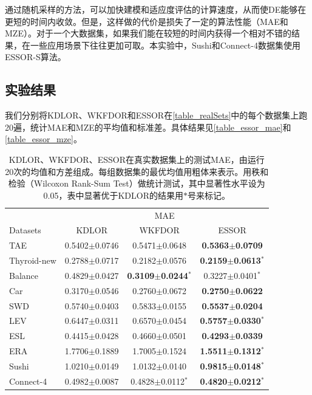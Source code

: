 通过随机采样的方法，可以加快建模和适应度评估的计算速度，从而使DE能够在更短的时间内收敛。但是，这样做的代价是损失了一定的算法性能（MAE和MZE）。对于一个大数据集，如果我们能在较短的时间内获得一个相对不错的结果，在一些应用场景下往往更加可取。本实验中，Sushi和Connect-4数据集使用ESSOR-S算法。

\subsection{实验结果}
我们分别将KDLOR、WKFDOR和ESSOR在\autoref{table_realSets}中的每个数据集上跑20遍，统计MAE和MZE的平均值和标准差。具体结果见\autoref{table_essor_mae}和\autoref{table_essor_mze}。

\begin{table}[!htbp]
\caption{KDLOR、WKFDOR、ESSOR在真实数据集上的测试MAE，由运行20次的均值和方差组成。每组数据集的最优均值用粗体来表示。用秩和检验（Wilcoxon Rank-Sum Test）做统计测试，其中显著性水平设为0.05，表中显著优于KDLOR的结果用$*$号来标记。}
\label{table_essor_mae}
\centering
\begin{tabular}{l|ccc}
\toprule
 & \multicolumn {3}{c}{MAE} \\
 \cmidrule {2-4}
Datasets & KDLOR & WKFDOR & ESSOR \\
\midrule
TAE &  0.5402$\pm$0.0746 &  0.5471$\pm$0.0648 & {\bf 0.5363$\pm$0.0709} \\
Thyroid-new & 0.2788$\pm$0.0717 &  0.2182$\pm$0.0576 & {\bf 0.2159$\pm$0.0613}$^{*}$ \\
Balance & 0.4829$\pm$0.0427 &  {\bf 0.3109$\pm$0.0244}$^{*}$ & 0.3227$\pm$0.0401$^{*}$ \\
Car & 0.3170$\pm$0.0546 &  0.2760$\pm$0.0672 & {\bf 0.2750$\pm$0.0622} \\
SWD & 0.5740$\pm$0.0403 &  0.5833$\pm$0.0155 & {\bf 0.5537$\pm$0.0204} \\
LEV & 0.6447$\pm$0.0311 &  0.6570$\pm$0.0454 & {\bf 0.5757$\pm$0.0330}$^{*}$ \\
ESL & 0.4415$\pm$0.0428 &  0.4660$\pm$0.0501 & {\bf 0.4293$\pm$0.0339} \\
ERA & 1.7706$\pm$0.1889 &  1.7005$\pm$0.1524 & {\bf 1.5511$\pm$0.1312}$^{*}$ \\
Sushi & 1.0210$\pm$0.0149 & 1.0132$\pm$0.0140 & {\bf 0.9815$\pm$0.0148}$^{*}$ \\
Connect-4 & 0.4982$\pm$0.0087 & 0.4828$\pm$0.0112$^{*}$ & {\bf 0.4820$\pm$0.0212}$^{*}$ \\
\bottomrule
\end{tabular}
\end{table}

